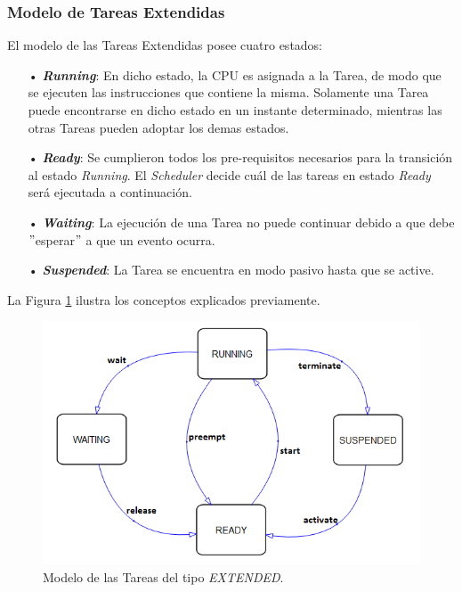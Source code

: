 \documentclass[12pt,letterpaper]{article}
\begin{document}
\subsubsection{Modelo de Tareas Extendidas}
El modelo de las Tareas Extendidas posee cuatro estados:
\begin{enumerate}
\item[•]\emph{\textbf{Running}}: En dicho estado, la CPU es asignada a la Tarea, de modo que se ejecuten las instrucciones que contiene la misma. Solamente una Tarea puede encontrarse en dicho estado en un instante determinado, mientras las otras Tareas pueden adoptar los demas estados.
\item[•]\emph{\textbf{Ready}}: Se cumplieron todos los pre-requisitos necesarios para la transición al estado \textit{Running}. El \textit{Scheduler} decide cuál de las tareas en estado \textit{Ready} será ejecutada a continuación.
\item[•]\emph{\textbf{Waiting}}: La ejecución de una Tarea no puede continuar debido a que debe $"$esperar$"$ a que un evento ocurra.
\item[•]\emph{\textbf{Suspended}}: La Tarea se encuentra en modo pasivo hasta que se active.
\end{enumerate}

La Figura \ref{Fig33} ilustra los conceptos explicados previamente.
\begin{center}
\begin{figure}[!h]
\centering
\includegraphics[width=10 cm]{figuras/f15.png}
\caption{Modelo de las Tareas del tipo \textit{EXTENDED}.}
\label{Fig33}
\end{figure}
\end{center}
\end{document}
